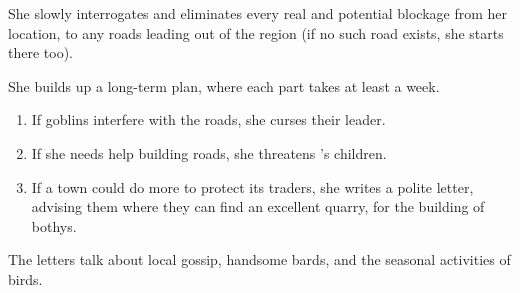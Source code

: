 \begin{multicols}{2}
\begin{dlist}
  She slowly interrogates and eliminates every real and potential blockage from her location, to any roads leading out of the region (if no such road exists, she starts there too).

  She builds up a long-term plan, where each part takes at least a week.
  \begin{enumerate}
    \item
    If goblins interfere with the roads, she curses their leader.
    \item
    If she needs help building roads, she threatens 's children.
    \item
    If a town could do more to protect its traders, she writes a polite letter, advising them where they can find an excellent quarry, for the building of \glspl{bothy}.
  \end{enumerate}
  The letters talk about local gossip, handsome bards, and the seasonal activities of birds.
\end{dlist}

\end{multicols}

\section{}
\label{ogre}

